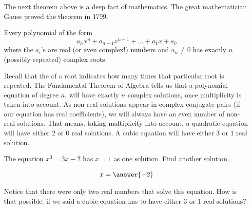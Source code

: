 \documentclass{ximera}
\begin{document}
The next theorem above is a deep fact of mathematics. The great mathematician Gauss proved the theorem in 1799. 
\begin{theorem}
  Every polynomial of the form
  \[
  a_n x^n + a_{n-1} x^{n-1} + \dots + a_1 x + a_0
  \]
  where the $a_i$'s are real (or even complex!) numbers and $a_n \ne 0$ has exactly
  $n$ (possibly repeated) complex roots.
\end{theorem}

Recall that the  of a root indicates how many times that particular root is repeated.
The Fundamental Theorem of Algebra tells us that a polynomial equation of degree $n$, will have exactly $n$ complex solutions, once multiplicity
is taken into account.  As non-real solutions appear in complex-conjugate pairs  (if our equation has real coefficients), we will always have an even number of non-real
solutions.  That means, taking multiplicity into account, a quadratic equation will have either $2$ or $0$ real solutions.  A cubic equation will have either $3$ or $1$ real
solution.


\begin{problem}

	The equation $x^3 = 3x-2$ has $x=1$ as one solution.  Find another solution.
	
	\begin{prompt}
		\[ x= \answer{-2} \]
	\end{prompt}
	\begin{feedback}
  		Notice that there were only two real numbers that solve this equation.  How is that possible, if we said a cubic equation has to have either
		$3$ or $1$ real solutions?
  	\end{feedback}
\end{problem}
\end{document}
